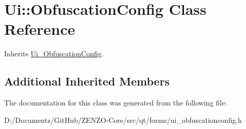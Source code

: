 \hypertarget{class_ui_1_1_obfuscation_config}{}\section{Ui\+::Obfuscation\+Config Class Reference}
\label{class_ui_1_1_obfuscation_config}


Inherits \mbox{\hyperlink{class_ui___obfuscation_config}{Ui\+\_\+\+Obfuscation\+Config}}.

\subsection*{Additional Inherited Members}


The documentation for this class was generated from the following file\+:\begin{DoxyCompactItemize}
\item 
D\+:/\+Documentz/\+Git\+Hub/\+Z\+E\+N\+Z\+O-\/\+Core/src/qt/forms/ui\+\_\+obfuscationconfig.\+h\end{DoxyCompactItemize}
